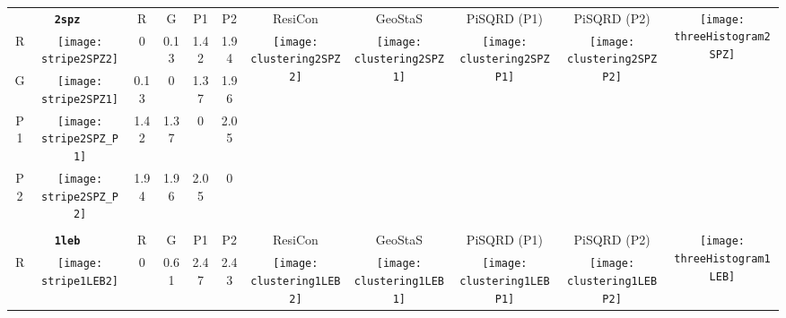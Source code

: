 \documentclass[a4paper,11pt,twoside]{book}%
\begin{document}
\begin{appendices}
\begin{sidewaystable}[h!]
\sffamily
\begin{tabular*}{4cm}{cc|c|c|c|c|c|c|c|c|c|}
\cline{1-11}
\multicolumn{2}{|c|}{{\bf \texttt{2spz}}} & R & G & P1 & P2 & ResiCon & GeoStaS & PiSQRD (P1) & PiSQRD (P2) & \multirow{5}{*}{\vspace{-0.15cm}\texttt{[image: threeHistogram2SPZ]}}  \\
\cline{1-10}
\multicolumn{1}{|c|}{R} & \texttt{[image: stripe2SPZ2]} & 0 & 0.13 & 1.42 & 1.94 & \multirow{4}{*}{\vspace{-0.3cm}\texttt{[image: clustering2SPZ2]}} & \multirow{4}{*}{\vspace{-0.3cm}\texttt{[image: clustering2SPZ1]}} & \multirow{4}{*}{\vspace{-0.3cm}\texttt{[image: clustering2SPZP1]}} & \multirow{4}{*}{\vspace{-0.3cm}\texttt{[image: clustering2SPZP2]}} &  \multirow{5}{*}{} \\
\cline{1-6}
\multicolumn{1}{|c|}{G} & \texttt{[image: stripe2SPZ1]} & 0.13 & 0 & 1.37 & 1.96 & \multirow{4}{*}{} & \multirow{4}{*}{} & \multirow{4}{*}{} & \multirow{4}{*}{} & \multirow{5}{*}{} \\
\cline{1-6}
\multicolumn{1}{|c|}{P1} & \texttt{[image: stripe2SPZ\_P1]} & 1.42 & 1.37 & 0 & 2.05 & \multirow{4}{*}{} & \multirow{4}{*}{} & \multirow{4}{*}{} & \multirow{4}{*}{} & \multirow{5}{*}{}  \\
\cline{1-6}
\multicolumn{1}{|c|}{P2} & \texttt{[image: stripe2SPZ\_P2]} & 1.94 & 1.96 & 2.05 & 0 & \multirow{4}{*}{} & \multirow{4}{*}{} & \multirow{4}{*}{} & \multirow{4}{*}{} & \multirow{5}{*}{}  \\
\cline{1-11}
\\
\cline{1-11}
\multicolumn{2}{|c|}{{\bf \texttt{1leb}}} & R & G & P1 & P2 & ResiCon & GeoStaS & PiSQRD (P1) & PiSQRD (P2) & \multirow{5}{*}{\vspace{-0.15cm}\texttt{[image: threeHistogram1LEB]}}  \\
\cline{1-10}
\multicolumn{1}{|c|}{R} & \texttt{[image: stripe1LEB2]} & 0 & 0.61 & 2.47 & 2.43 & \multirow{4}{*}{\vspace{-0.3cm}\texttt{[image: clustering1LEB2]}} & \multirow{4}{*}{\vspace{-0.3cm}\texttt{[image: clustering1LEB1]}} & \multirow{4}{*}{\vspace{-0.3cm}\texttt{[image: clustering1LEBP1]}} & \multirow{4}{*}{\vspace{-0.3cm}\texttt{[image: clustering1LEBP2]}} &  \multirow{5}{*}{} \\

\end{tabular*}
\end{sidewaystable}
\end{appendices}
\end{document}
